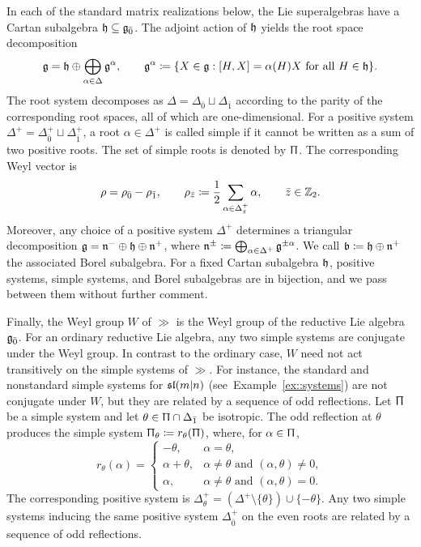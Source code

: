 In each of the standard matrix realizations below, the Lie superalgebras have a Cartan subalgebra $\hh\subseteq\even$. The adjoint action of $\hh$ yields the root space decomposition
\begin{equation}
\gg=\hh\oplus\bigoplus_{\alpha\in\Delta}\gg^\alpha,
\qquad
\gg^\alpha\coloneqq
\{X\in\gg:[H,X]=\alpha(H)X\text{ for all }H\in\hh\}.
\end{equation}
The root system decomposes as $\Delta=\Delta_{\bar0}\sqcup\Delta_{\bar1}$ according to the parity of the corresponding root spaces, all of which are one-dimensional. For a positive system $\Delta^+=\Delta_{\bar0}^+\sqcup\Delta_{\bar1}^+$, a root $\alpha\in\Delta^+$ is called simple if it cannot be written as a sum of two positive roots. The set of simple roots is denoted by $\Uppi$. The corresponding Weyl vector is
\begin{equation}
\rho=\rho_{\bar0}-\rho_{\bar1},
\qquad
\rho_{\bar z}\coloneqq\frac12\sum_{\alpha\in\Delta_{\bar z}^+}\alpha, \qquad \bar{z}\in \ZZ_{2}.
\end{equation} 
Moreover, any choice of a positive system $\Delta^{+}$ determines a triangular decomposition $\gg = \nn^{-}\oplus \hh \oplus \nn^{+}$, where $\nn^{\pm} \coloneqq \bigoplus_{\alpha\in \Delta^{+}}\gg^{\pm \alpha}$. We call $\bb\coloneqq\hh\oplus\nn^+$ the associated Borel subalgebra. For a fixed Cartan subalgebra $\hh$, positive systems, simple systems, and Borel subalgebras are in bijection, and we pass between them without further comment.


Finally, the Weyl group $W$ of $\gg$ is the Weyl group of the reductive Lie algebra $\even$. For an ordinary reductive Lie algebra, any two simple systems are conjugate under the Weyl group. In contrast to the ordinary case, $W$ need not act transitively on the simple systems of $\gg$. For instance, the standard and nonstandard simple systems for $\sl(m\vert n)$ (see~Example~\ref{ex::systems}) are not conjugate under $W$, but they are related by a sequence of odd reflections.
Let $\Uppi$ be a simple system and let $\theta\in\Uppi\cap\Delta_{\bar{1}}$ be isotropic. The odd reflection at $\theta$ produces the simple system $\Uppi_\theta\coloneqq r_\theta(\Uppi)$, where, for $\alpha\in\Uppi$,
\begin{equation}
r_\theta(\alpha)=
\begin{cases}
-\theta,&\alpha=\theta,\\
\alpha+\theta,&\alpha\neq\theta\text{ and }(\alpha,\theta)\neq0,\\
\alpha,&\alpha\neq\theta\text{ and }(\alpha,\theta)=0.
\end{cases}
\label{eq::odd-reflection}
\end{equation}
The corresponding positive system is $\Delta_\theta^+=(\Delta^+\setminus\{\theta\})\cup\{-\theta\}$. Any two simple systems inducing the same positive system $\Delta_{\bar{0}}^+$ on the even roots are related by a sequence of odd reflections.

